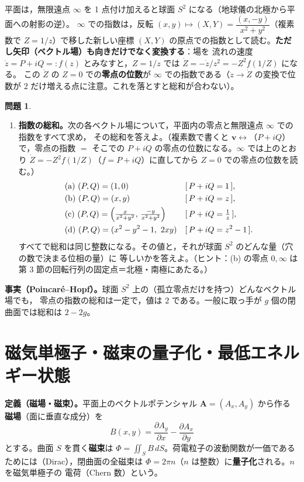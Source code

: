 \documentclass[dvipdfmx, uplatex]{jsarticle}
\theoremstyle{definition}
\newtheorem*{prob}{問題}
\begin{document}
\smallskip
平面は，無限遠点 $\infty$ を 1 点付け加えると球面 $S^2$ になる（地球儀の北極から平面への射影の逆）。
$\infty$ での指数は，反転 $(x,y)\mapsto(X,Y)=\dfrac{(x,-y)}{x^2+y^2}$（複素数で $Z=1/z$）で移した新しい座標
$(X,Y)$ の原点での指数として読む。\textbf{ただし矢印（ベクトル場）も向きだけでなく変換する}：場を
流れの速度 $\dot z=P+iQ=:f(z)$ とみなすと，$Z=1/z$ では $\dot Z=-\dot z/z^2=-Z^2 f(1/Z)$ になる。
この $\dot Z$ の $Z=0$ での\textbf{零点の位数}が $\infty$ での指数である（$\dot z\to\dot Z$ の変換で位数が
$2$ だけ増える点に注意。これを落とすと総和が合わない）。

\begin{prob}
\begin{enumerate}[start=8]
\item \textbf{指数の総和。}次の各ベクトル場について，平面内の零点と無限遠点 $\infty$ での指数をすべて求め，
その総和を答えよ。（複素数で書くと $\bm v\leftrightarrow$（$P+iQ$）で，零点の指数 $=$ そこでの
$P+iQ$ の零点の位数になる。$\infty$ では上のとおり $\dot Z=-Z^2 f(1/Z)$（$f=P+iQ$）に直してから
$Z=0$ での零点の位数を読む。）
\[
\begin{aligned}
&\text{(a)}\ (P,Q)=(1,0) && [\,P+iQ=1\,],\\
&\text{(b)}\ (P,Q)=(x,y) && [\,P+iQ=z\,],\\
&\text{(c)}\ (P,Q)=\Bigl(\tfrac{x}{x^2+y^2},\,\tfrac{-y}{x^2+y^2}\Bigr) && [\,P+iQ=\tfrac1z\,],\\
&\text{(d)}\ (P,Q)=(x^2-y^2-1,\ 2xy) && [\,P+iQ=z^2-1\,].
\end{aligned}
\]
すべてで総和は同じ整数になる。その値と，それが球面 $S^2$ のどんな量（穴の数で決まる位相の量）に
等しいかを答えよ。（ヒント：(b) の零点 $0,\infty$ は第 3 節の回転行列の固定点＝北極・南極にあたる。）
\end{enumerate}
\end{prob}

\noindent\textbf{事実（Poincar\'e--Hopf）。}球面 $S^2$ 上の（孤立零点だけを持つ）どんなベクトル場でも，
零点の指数の総和は一定で，値は $2$ である。一般に取っ手が $g$ 個の閉曲面では総和は $2-2g$。

\section{磁気単極子・磁束の量子化・最低エネルギー状態}
\noindent\textbf{定義（磁場・磁束）。}平面上のベクトルポテンシャル $\bm A=(A_x,A_y)$ から作る
\textbf{磁場}（面に垂直な成分）を
\[
    B(x,y)=\frac{\partial A_y}{\partial x}-\frac{\partial A_x}{\partial y}
\]
とする。曲面 $S$ を貫く\textbf{磁束}は $\displaystyle\Phi=\iint_S B\,dS$。荷電粒子の波動関数が一価である
ためには（Dirac），閉曲面の全磁束は $\Phi=2\pi n$（$n$ は整数）に\textbf{量子化}される。$n$ を磁気単極子の
電荷（Chern 数）という。
\end{document}
